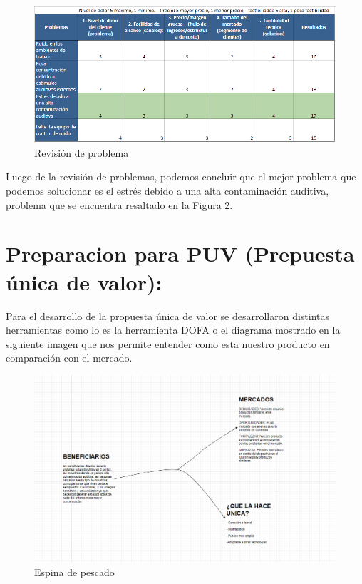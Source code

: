 \documentclass[conference,compsoc,onecolumn]{IEEEtran}
\begin{document}
\begin{figure}[H]
    \centering
    \includegraphics[scale = 0.7]{imagenes/cuadro.PNG}
    \caption{Revisión de problema}
    \label{fig:my_label}
\end{figure}

Luego de la revisión de problemas, podemos concluir que el mejor problema que podemos solucionar es el estrés debido a una alta contaminación auditiva, problema que se encuentra resaltado en la Figura 2.\bigskip


\section{Preparacion para PUV (Prepuesta única de valor):}

Para el desarrollo de la propuesta única de valor se desarrollaron distintas herramientas como lo es la herramienta DOFA o el diagrama mostrado en la siguiente imagen que nos permite entender como esta nuestro producto en comparación con el mercado.

\begin{figure}[H]
    \centering
    \includegraphics[scale = 0.5]{imagenes/PUV1.png}
    \caption{Espina de pescado}
    \label{fig:my_label}
\end{figure}
\end{document}
